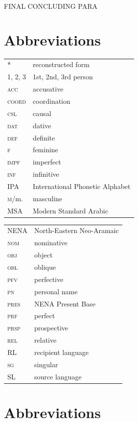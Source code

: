 \documentclass[output=paper]{langsci/langscibook}
\begin{document}
FINAL CONCLUDING PARA

\section*{Abbreviations}

\begin{tabularx}{.5\textwidth}{@{}lQ@{}}
*  &  reconstructed form\\
\textsc{1, 2, 3} & 1st, 2nd, 3rd person \\
\textsc{acc} & accusative\\
\textsc{coord} & {coordination}\\
\textsc{csl} & causal \\
\textsc{dat} & dative\\
\textsc{def} & {definite}\\
\textsc{f} & feminine\\
\textsc{impf} & imperfect\\
\textsc{inf} & {infinitive}\\
IPA & International Phonetic Alphabet\\
\textsc{m}/m. & masculine\\
MSA & Modern Standard Arabic
\end{tabularx}%
\begin{tabularx}{.5\textwidth}{@{}lQ@{}}
NENA & North-Eastern Neo-Aramaic\\
\textsc{nom} & nominative\\
\textsc{obj} & object \\
\textsc{obl} & oblique \\
\textsc{pfv} & perfective\\
\textsc{pn} & personal name \\
\textsc{pres}    & NENA Present Base \\
\textsc{prf} & perfect\\
\textsc{prsp} & {prospective}\\
\textsc{rel} & {relative}\\
{RL} & {recipient language}\\
\textsc{sg} & singular\\
{SL} & {source language}\\
\end{tabularx}%

\section*{Abbreviations}
\end{document}
